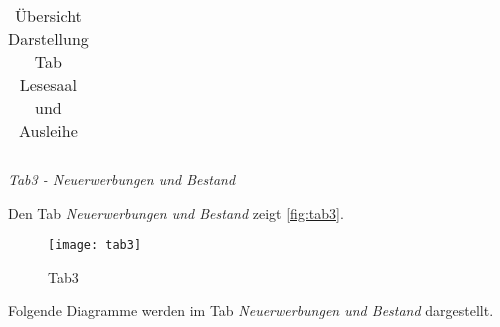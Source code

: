 \begin{table}[h]
\begin{adjustbox}{max width=\textwidth}
\begin{tabular}{p{}p{}p{}p{}p{}p{}}
        \bottomrule
        \end{tabular}
        \end{adjustbox}
        \caption{%
            Übersicht Darstellung Tab Lesesaal und Ausleihe
        }
        \label{tab:Darstellung Tab Lesesaal und Ausleihe}
        \end{table}
    \endgroup



    \clearpage
    \noindent
    \textit{Tab3 - Neuerwerbungen und Bestand}
    
    Den Tab \textit{Neuerwerbungen und Bestand} zeigt \autoref{fig:tab3}.

    
    \begin{figure}[H]
        \centering
            \texttt{[image: tab3]}
            \caption{Tab3}
            \label{fig:tab3}
    \end{figure}

    \clearpage
    Folgende Diagramme werden im Tab \textit{Neuerwerbungen und Bestand} dargestellt.
    

